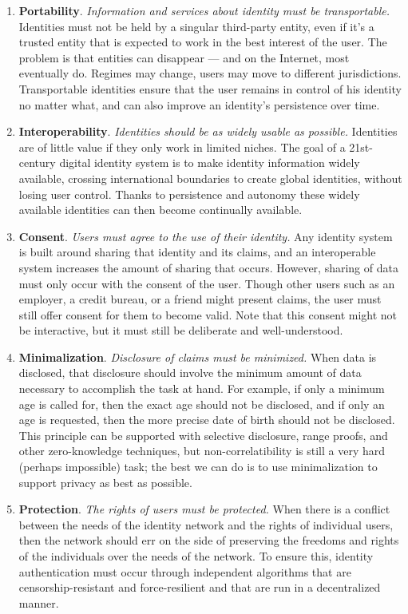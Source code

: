 \documentclass[twoside]{article}
\begin{document}
\begin{enumerate}
  \item \textbf{Portability}. \emph{Information and services about identity must be transportable.} Identities must not be held by a singular third-party entity, even if it’s a trusted entity that is expected to work in the best interest of the user. The problem is that entities can disappear — and on the Internet, most eventually do. Regimes may change, users may move to different jurisdictions. Transportable identities ensure that the user remains in control of his identity no matter what, and can also improve an identity’s persistence over time.
  \item \textbf{Interoperability}. \emph{Identities should be as widely usable as possible.} Identities are of little value if they only work in limited niches. The goal of a 21st-century digital identity system is to make identity information widely available, crossing international boundaries to create global identities, without losing user control. Thanks to persistence and autonomy these widely available identities can then become continually available.
  \item \textbf{Consent}. \emph{Users must agree to the use of their identity.} Any identity system is built around sharing that identity and its claims, and an interoperable system increases the amount of sharing that occurs. However, sharing of data must only occur with the consent of the user. Though other users such as an employer, a credit bureau, or a friend might present claims, the user must still offer consent for them to become valid. Note that this consent might not be interactive, but it must still be deliberate and well-understood.
  \item \textbf{Minimalization}. \emph{Disclosure of claims must be minimized.} When data is disclosed, that disclosure should involve the minimum amount of data necessary to accomplish the task at hand. For example, if only a minimum age is called for, then the exact age should not be disclosed, and if only an age is requested, then the more precise date of birth should not be disclosed. This principle can be supported with selective disclosure, range proofs, and other zero-knowledge techniques, but non-correlatibility is still a very hard (perhaps impossible) task; the best we can do is to use minimalization to support privacy as best as possible.
  \item \textbf{Protection}. \emph{The rights of users must be protected.} When there is a conflict between the needs of the identity network and the rights of individual users, then the network should err on the side of preserving the freedoms and rights of the individuals over the needs of the network. To ensure this, identity authentication must occur through independent algorithms that are censorship-resistant and force-resilient and that are run in a decentralized manner.
\end{enumerate}
\end{document}
